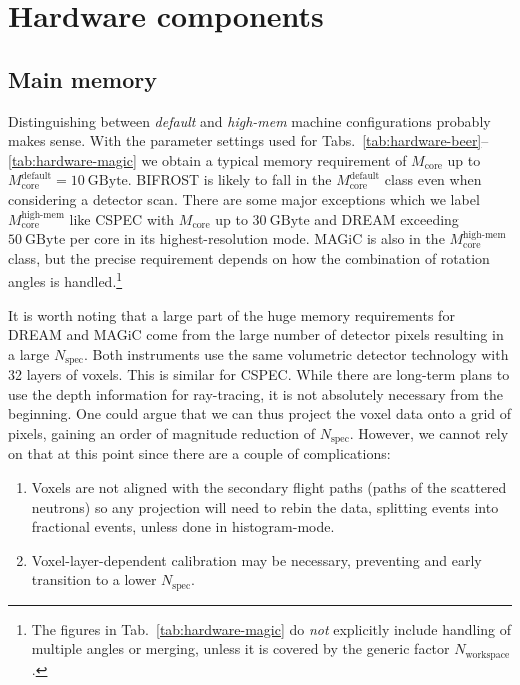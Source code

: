 \documentclass[a4paper,english,numbers=noenddot,bibliography=totoc,chapterprefix=on,DIV=12]{scrartcl}
\newcommand{\Nworkspace}{N_{\text{workspace}}}
\newcommand{\Nspec}{N_{\text{spec}}}
\newcommand{\Mcore}{M_{\text{core}}}
\newcommand{\bifrost}{BIFROST\xspace}
\newcommand{\cspec}{CSPEC\xspace}
\newcommand{\dream}{DREAM\xspace}
\newcommand{\magic}{MAGiC\xspace}
\begin{document}
\section{Hardware components}


\subsection{Main memory}

Distinguishing between \emph{default} and \emph{high-mem} machine configurations probably makes sense.
With the parameter settings used for Tabs.~\ref{tab:hardware-beer}--\ref{tab:hardware-magic} we obtain a typical memory requirement of $\Mcore$ up to $\Mcore^{\text{default}} = 10~\mathrm{GByte}$.
\bifrost is likely to fall in the $\Mcore^{\text{default}}$ class even when considering a detector scan.
There are some major exceptions which we label $\Mcore^{\text{high-mem}}$ like \cspec with $\Mcore$ up to $30~\mathrm{GByte}$ and \dream exceeding $50~\mathrm{GByte}$ per core in its highest-resolution mode.
\magic is also in the $\Mcore^{\text{high-mem}}$ class, but the precise requirement depends on how the combination of rotation angles is handled.\footnote{The figures in Tab.~\ref{tab:hardware-magic} do \emph{not} explicitly include handling of multiple angles or merging, unless it is covered by the generic factor $\Nworkspace$.}

It is worth noting that a large part of the huge memory requirements for \dream and \magic come from the large number of detector pixels resulting in a large $\Nspec$.
Both instruments use the same volumetric detector technology with 32 layers of voxels.
This is similar for \cspec.
While there are long-term plans to use the depth information for ray-tracing, it is not absolutely necessary from the beginning.
One could argue that we can thus project the voxel data onto a grid of pixels, gaining an order of magnitude reduction of $\Nspec$.
However, we cannot rely on that at this point since there are a couple of complications:
\begin{enumerate}
  \item Voxels are not aligned with the secondary flight paths (paths of the scattered neutrons) so any projection will need to rebin the data, splitting events into fractional events, unless done in histogram-mode.
  \item Voxel-layer-dependent calibration may be necessary, preventing and early transition to a lower $\Nspec$.
\end{enumerate}
\end{document}
